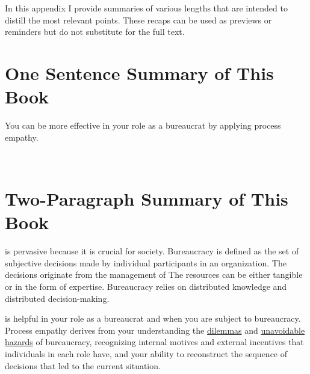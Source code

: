 In this appendix I provide summaries of various lengths that are intended to distill the most relevant points. These recaps can be used as previews or reminders but do not substitute for the full text.

\section*{One Sentence Summary of This Book}

You can be more effective in your role as a \gls{bureaucrat} by applying \gls{process empathy}.

\ \\

\section*{Two-Paragraph Summary of This Book}


\iftoggle{glossarysubstitutionworks}{\Gls{bureaucracy}}{Bureaucracy} is pervasive because it is crucial for society. Bureaucracy is defined as the set of subjective decisions made by individual participants in an organization. The decisions originate from the 
management of \iftoggle{glossarysubstitutionworks}{\glspl{shared resource}.}{shared resources.} 
The resources can be either tangible or in the form of expertise. Bureaucracy relies on
distributed knowledge and distributed decision-making.

\iftoggle{glossarysubstitutionworks}{\Gls{process empathy}}{Process empathy} 
is helpful in your role as a bureaucrat and when you are subject to bureaucracy. 
Process empathy derives from your understanding the \hyperref[sec:dilemma-trilemma]{dilemmas} and \hyperref[sec:unavoidable-hazards]{unavoidable hazards} of bureaucracy, recognizing internal \gls{motives} and external \gls{incentives} that individuals in each role have, and your ability to reconstruct the sequence of decisions that led to the current situation. 





